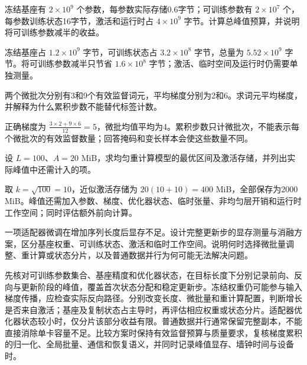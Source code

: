 
\begin{exercises}
\begin{exercise} 冻结基座有 $2\times10^9$ 个参数，每参数实际存储0.6字节；可训练参数有 $2\times10^7$ 个，每参数训练状态16字节，激活和运行时占 $4\times10^9$ 字节。计算总峰值预算，并说明将可训练参数减半的收益。

\begin{solution}
冻结基座占 $1.2\times10^9$ 字节，可训练状态占 $3.2\times10^8$ 字节，总量为 $5.52\times10^9$ 字节。将可训练参数减半只节省 $1.6\times10^8$ 字节；激活、临时空间及运行时仍需要单独测量。
\end{solution}
\end{exercise}

\begin{exercise} 两个微批次分别有3和9个有效监督词元，平均梯度分别为2和6。求词元平均梯度，并解释为什么累积步数不能替代标签计数。

\begin{solution}
正确梯度为 $\frac{3\times2+9\times6}{12}=5$，微批均值平均为4。累积步数只计微批次，不能表示每个微批次的有效监督数量；回答掩码和变长样本会使这些数量不同。
\end{solution}
\end{exercise}

\begin{exercise} 设 $L=100$、$A=20$ MiB，求均匀重计算模型的最优区间及激活存储，并列出实际峰值中还需计入的项。

\begin{solution}
取 $k=\sqrt{100}=10$，近似激活存储为 $20(10+10)=400$ MiB，全部保存为2000 MiB。峰值还需加入参数、梯度、优化器状态、临时张量、非均匀层开销和运行时工作空间；同时评估额外前向计算。
\end{solution}
\end{exercise}

\begin{exercise} 一项适配器微调在增加序列长度后显存不足。设计完整更新步的显存测量与消融方案，区分基座权重、可训练状态、激活和临时工作空间。说明何时选择微批量调整、重计算或状态分片，以及普通数据并行为何可能无法解决问题。

\begin{solution}
先核对可训练参数集合、基座精度和优化器状态，在目标长度下分别记录前向、反向与更新阶段的峰值，覆盖首次状态分配和稳定更新步。冻结权重仍可能参与输入梯度传播，应检查实际反向路径。分别改变长度、微批量和重计算配置，判断增长是否来自激活；基座及复制状态占主导时，再评估相应权重或状态分片。适配器优化器状态较小时，仅分片该部分收益有限。普通数据并行通常保留完整副本，不能直接消除单卡容量不足。比较方案时保持有效监督预算与质量要求，复核梯度累积的归一化、全局批量、通信和恢复语义，并同时记录峰值显存、墙钟时间与设备时。
\end{solution}
\end{exercise}

\end{exercises}
